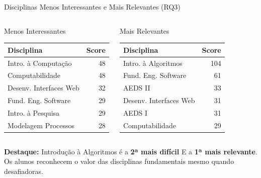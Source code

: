 \documentclass[fleqn]{beamer}
\begin{document}
\begin{frame}{Disciplinas Menos Interessantes e Mais Relevantes (RQ3)}
\begin{columns}[T]
\begin{block}{Menos Interessantes}
\scriptsize
\begin{tabular}{lr}
\toprule
\textbf{Disciplina} & \textbf{Score} \\
\midrule
Intro. à Computação & 48 \\
Computabilidade & 48 \\
Desenv. Interfaces Web & 32 \\
Fund. Eng. Software & 29 \\
Intro. à Pesquisa & 29 \\
Modelagem Processos & 28 \\
\bottomrule
\end{tabular}
\end{block}

\begin{block}{Mais Relevantes}
\scriptsize
\begin{tabular}{lr}
\toprule
\textbf{Disciplina} & \textbf{Score} \\
\midrule
Intro. à Algoritmos & 104 \\
Fund. Eng. Software & 61 \\
AEDS II & 33 \\
Desenv. Interfaces Web & 31 \\
AEDS I & 31 \\
Computabilidade & 29 \\
\bottomrule
\end{tabular}
\end{block}
\end{columns}

\vspace{0.3cm}
\textbf{Destaque:} Introdução à Algoritmos é a \textbf{2ª mais difícil} E a \textbf{1ª mais relevante}.\\ Os alunos reconhecem o valor das disciplinas fundamentais mesmo quando desafiadoras.
\end{frame}
\end{document}
